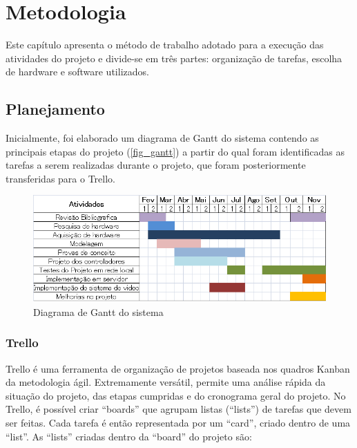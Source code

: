 
	\chapter{Metodologia}\label{cap-metodologia}
	
	Este capítulo apresenta o método de trabalho adotado para a execução das atividades
	do projeto e divide-se em três partes: organização de tarefas, escolha de hardware e software utilizados.
	
	

	
	\section{Planejamento}\label{sec-planejamento}
	Inicialmente, foi elaborado um diagrama de Gantt do sistema contendo as principais etapas do projeto (\autoref{fig_gantt}) a partir do qual foram identificadas as tarefas a serem realizadas durante o projeto, que foram posteriormente transferidas para o Trello.
	\begin{figure}[h!]
	\caption{\label{fig_gantt} Diagrama de Gantt do sistema }
		\begin{center}
	\includegraphics[width=\textwidth]{gantt.png}	
\end{center}
\end{figure}

	\subsection{Trello}\label{subsec-eap}
	Trello é uma ferramenta de organização de projetos  baseada nos quadros Kanban da metodologia ágil. Extremamente versátil, permite uma análise rápida da situação do projeto, das etapas cumpridas e do cronograma geral do projeto. No Trello, é possível criar “boards” que agrupam listas (“lists”) de tarefas que devem ser feitas. Cada tarefa é então representada por um “card”, criado dentro de uma “list”. As “lists” criadas dentro da “board” do projeto são:\par
	

